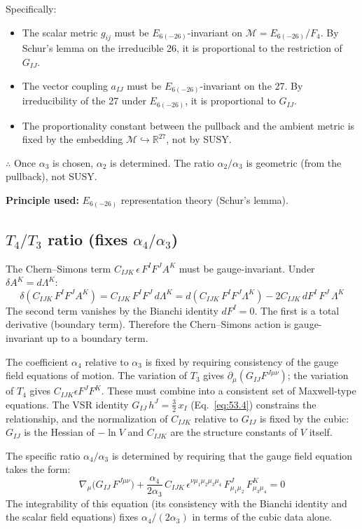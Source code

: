 Specifically:
\begin{itemize}
  \item The scalar metric $g_{ij}$ must be $E_{6(-26)}$-invariant on
    $\mathcal{M} = E_{6(-26)}/F_4$. By Schur's lemma on the irreducible 26,
    it is proportional to the restriction of $G_{IJ}$.
  \item The vector coupling $a_{IJ}$ must be $E_{6(-26)}$-invariant on the 27.
    By irreducibility of the 27 under $E_{6(-26)}$, it is proportional to
    $G_{IJ}$.
  \item The proportionality constant between the pullback and the ambient metric
    is fixed by the embedding $\mathcal{M} \hookrightarrow \mathbb{R}^{27}$,
    not by SUSY.
\end{itemize}

$\therefore$ Once $\alpha_3$ is chosen, $\alpha_2$ is determined. The
ratio $\alpha_2/\alpha_3$ is geometric (from the pullback), not SUSY.

\textbf{Principle used:} $E_{6(-26)}$ representation theory (Schur's lemma).

\subsection{$T_4/T_3$ ratio (fixes $\alpha_4/\alpha_3$)}

The Chern--Simons term $C_{IJK}\,\epsilon\,F^I F^J A^K$ must be gauge-invariant.
Under $\delta A^K = d\Lambda^K$:
$$
  \delta(C_{IJK}\,F^I F^J A^K) = C_{IJK}\,F^I F^J\,d\Lambda^K
  = d(C_{IJK}\,F^I F^J \Lambda^K) - 2C_{IJK}\,dF^I\,F^J\,\Lambda^K
$$
The second term vanishes by the Bianchi identity $dF^I = 0$.
The first is a total derivative (boundary term). Therefore the Chern--Simons
action is gauge-invariant up to a boundary term.

The coefficient $\alpha_4$ relative to $\alpha_3$ is fixed by requiring
consistency of the gauge field equations of motion. The variation of $T_3$
gives $\partial_\mu(G_{IJ} F^{J\mu\nu})$; the variation of $T_4$ gives
$C_{IJK}\epsilon F^J F^K$. These must combine into a consistent set of
Maxwell-type equations. The VSR identity
$G_{IJ}\,h^J = \tfrac{3}{2}\,x_I$ (Eq.~\ref{eq:53.4}) constrains the
relationship, and the normalization of $C_{IJK}$ relative to $G_{IJ}$
is fixed by the cubic: $G_{IJ}$ is the Hessian of $-\ln V$ and
$C_{IJK}$ are the structure constants of $V$ itself.

The specific ratio $\alpha_4/\alpha_3$ is determined by requiring that the
gauge field equation takes the form:
$$
  \nabla_\mu\bigl(G_{IJ}\,F^{J\mu\nu}\bigr)
  + \frac{\alpha_4}{2\alpha_3}\,C_{IJK}\,\epsilon^{\nu\mu_1\mu_2\mu_3\mu_4}\,
    F^J_{\mu_1\mu_2}\,F^K_{\mu_3\mu_4} = 0
$$
The integrability of this equation (its consistency with the Bianchi identity
and the scalar field equations) fixes $\alpha_4/(2\alpha_3)$ in terms of the
cubic data alone.

